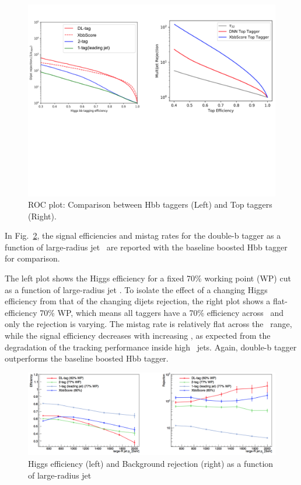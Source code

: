 \begin{figure}[htbp!]
    \centering
    \includegraphics[clip, trim=0 9cm 0 0, width=1\textwidth]{chapters/c10/figures/roc}
    \caption{ROC plot: Comparison between Hbb taggers (Left) and Top taggers (Right).}
    \label{fig:xbb_roc}
\end{figure}

\par In Fig.~\ref{fig:xbb_pt}, the signal efficiencies and mistag rates for the double-b tagger as a function of large-radius jet \pt~are reported with the baseline boosted Hbb tagger for comparison.

\par The left plot shows the Higgs efficiency for a fixed 70\% working point (WP) cut as a function of large-radius jet \pt. To isolate the effect of a changing Higgs efficiency from that of the changing dijets rejection, the right plot shows a flat-efficiency 70\% WP, which means all taggers have a 70\% efficiency across \pt~and only the rejection is varying. The mistag rate is relatively flat across the \pt~range, while the signal efficiency decreases with increasing \pt, as expected from the degradation of the tracking performance inside high \pt~jets. 
Again, double-b tagger outperforms the baseline boosted Hbb tagger.

\begin{figure}[htbp!]
    \centering
    \includegraphics[clip, trim=0 0 0 0, width=1\textwidth]{chapters/c10/figures/pt}
    \caption{Higgs efficiency (left) and Background rejection (right) as a function of large-radius jet \pt}
    \label{fig:xbb_pt}
\end{figure}
